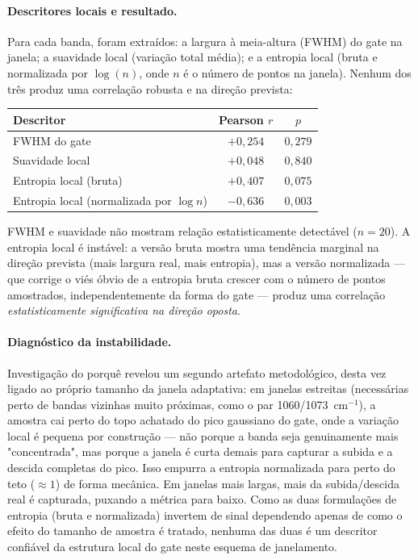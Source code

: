 \paragraph{Descritores locais e resultado.} Para cada banda, foram extraídos: a largura à meia-altura (FWHM) do gate na janela; a suavidade local (variação total média); e a entropia local (bruta e normalizada por $\log(n)$, onde $n$ é o número de pontos na janela). Nenhum dos três produz uma correlação robusta e na direção prevista:

\begin{center}
\begin{tabular}{lcc}
\toprule
Descritor & Pearson $r$ & $p$ \\
\midrule
FWHM do gate & $+0{,}254$ & $0{,}279$ \\
Suavidade local & $+0{,}048$ & $0{,}840$ \\
Entropia local (bruta) & $+0{,}407$ & $0{,}075$ \\
Entropia local (normalizada por $\log n$) & $-0{,}636$ & $0{,}003$ \\
\bottomrule
\end{tabular}
\end{center}

FWHM e suavidade não mostram relação estatisticamente detectável ($n=20$). A entropia local é instável: a versão bruta mostra uma tendência marginal na direção prevista (mais largura real, mais entropia), mas a versão normalizada --- que corrige o viés óbvio de a entropia bruta crescer com o número de pontos amostrados, independentemente da forma do gate --- produz uma correlação \emph{estatisticamente significativa na direção oposta}.

\paragraph{Diagnóstico da instabilidade.} Investigação do porquê revelou um segundo artefato metodológico, desta vez ligado ao próprio tamanho da janela adaptativa: em janelas estreitas (necessárias perto de bandas vizinhas muito próximas, como o par 1060/1073~cm$^{-1}$), a amostra cai perto do topo achatado do pico gaussiano do gate, onde a variação local é pequena por construção --- não porque a banda seja genuinamente mais "concentrada", mas porque a janela é curta demais para capturar a subida e a descida completas do pico. Isso empurra a entropia normalizada para perto do teto ($\approx 1$) de forma mecânica. Em janelas mais largas, mais da subida/descida real é capturada, puxando a métrica para baixo. Como as duas formulações de entropia (bruta e normalizada) invertem de sinal dependendo apenas de como o efeito do tamanho de amostra é tratado, nenhuma das duas é um descritor confiável da estrutura local do gate neste esquema de janelamento.

